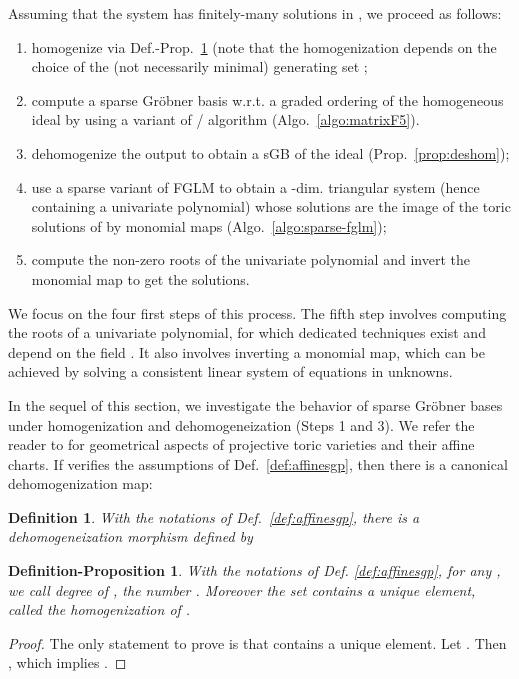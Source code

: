 \documentclass[12pt]{article}
\numberwithin{equation}{section}
\numberwithin{theorem}{section}
\newtheorem{defprop}[theorem]{Definition-Proposition}
\newtheorem{definition}[theorem]{Definition}
\begin{document}
Assuming that the system  has finitely-many solutions in , we proceed as follows:
\begin{enumerate}
\item homogenize  via Def.-Prop.~\ref{def:hom} (note that the homogenization depends on the choice of the (not necessarily minimal) generating set ;
\item compute a sparse Gr\"obner
  basis w.r.t. a graded ordering of the homogeneous ideal  by using a variant of /
  algorithm (Algo.~\ref{algo:matrixF5}). 
\item dehomogenize the output to obtain a sGB of the ideal  (Prop.~\ref{prop:deshom});
\item use a sparse variant of FGLM to obtain a -dim. triangular system (hence containing a univariate polynomial) whose solutions are the image of the toric solutions of  by monomial maps (Algo.~\ref{algo:sparse-fglm});
\item compute the non-zero roots of the univariate polynomial and invert the monomial map to get the solutions.
\end{enumerate}

We focus on the four first steps of this process.  The fifth step
involves computing the roots of a univariate polynomial, for which
dedicated techniques exist and depend on the field . It also
involves inverting a monomial map, which can be achieved by solving a
consistent linear system of  equations in  unknowns.

In the sequel of this section, we investigate the behavior of sparse
Gr\"obner bases under homogenization and dehomogeneization (Steps 1 and
3). We refer the reader to \cite[Ch. 2]{CoxLitSch11} for geometrical
aspects of projective toric varieties and their affine charts. If 
verifies the assumptions of Def.~\ref{def:affinesgp}, then there is a
canonical dehomogenization map:

\begin{definition}\label{def:dehom}
With the notations of Def.~\ref{def:affinesgp}, there is a \emph{dehomogeneization morphism}  defined by

\end{definition}

\begin{defprop}\label{def:hom}
With the notations of Def. \ref{def:affinesgp}, for any , we call degree of , the number . Moreover the set  contains a unique element, called the \emph{homogenization} of .
\end{defprop}
\begin{proof}
The only statement to prove is that  contains a unique element. Let . Then , which implies .
\end{proof}
\end{document}
